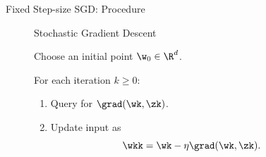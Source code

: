 \documentclass[mathserif,notheorems, hyperref={colorlinks, citecolor=blue, urlcolor=blue, linkcolor=blue}]{beamer}
\begin{document}
    \begin{frame}{Fixed Step-size SGD: Procedure}
       
        \begin{figure}[t]
        \begin{procedure}{Stochastic Gradient Descent}
        \item Choose an initial point \( \w_0 \in \R^d \).
            \vspace{2ex}
        \item For each iteration \( k \geq 0 \):
            \begin{enumerate}
                \item Query \oracle{} for \( \grad(\wk, \zk) \).
                    \vspace{1ex}
                \item Update input as\vspace{-1ex}%
                    \[ \wkk = \wk - \eta \grad(\wk, \zk). \]
            \end{enumerate}
        \end{procedure}
        \end{figure}

    \end{frame}
\end{document}
